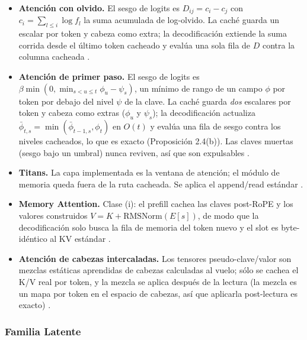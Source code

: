 \begin{itemize}[leftmargin=*]
    \item \textbf{Atención con olvido.} El sesgo de logits es $D_{ij} = c_i - c_j$ con $c_i = \sum_{l\le i}\log f_l$ la suma acumulada de log-olvido. La caché guarda un escalar por token y cabeza como extra; la decodificación extiende la suma corrida desde el último token cacheado y evalúa una sola fila de $D$ contra la columna cacheada \citep{lin_forgetting_transformer_2025}.
    \item \textbf{Atención de primer paso.} El sesgo de logits es $\beta\min(0,\min_{s<u\le t}\phi_u-\psi_s)$, un mínimo de rango de un campo $\phi$ por token por debajo del nivel $\psi$ de la clave. La caché guarda \emph{dos} escalares por token y cabeza como extras ($\phi_u$ y $\psi_s$); la decodificación actualiza $\bar{\phi}_{t,s}=\min(\bar{\phi}_{t-1,s},\phi_t)$ en $O(t)$ y evalúa una fila de sesgo contra los niveles cacheados, lo que es exacto (Proposición 2.4(b)). Las claves muertas (sesgo bajo un umbral) nunca reviven, así que son expulsables \citep{liu_first_passage_2026}.
    \item \textbf{Titans.} La capa implementada es la ventana de atención; el módulo de memoria queda fuera de la ruta cacheada. Se aplica el append/read estándar \citep{behrouz_titans_2025}.
    \item \textbf{Memory Attention.} Clase (i): el prefill cachea las claves post-RoPE y los valores construidos $V = K + \mathrm{RMSNorm}(E[s])$, de modo que la decodificación solo busca la fila de memoria del token nuevo y el slot es byte-idéntico al KV estándar \citep{kang_memory_attention_2026}.
    \item \textbf{Atención de cabezas intercaladas.} Los tensores pseudo-clave/valor son mezclas estáticas aprendidas de cabezas calculadas al vuelo; sólo se cachea el K/V real por token, y la mezcla se aplica después de la lectura (la mezcla es un mapa por token en el espacio de cabezas, así que aplicarla post-lectura es exacto) \citep{duvvuri_iha_2026}.
\end{itemize}

\subsubsection{Familia Latente}

